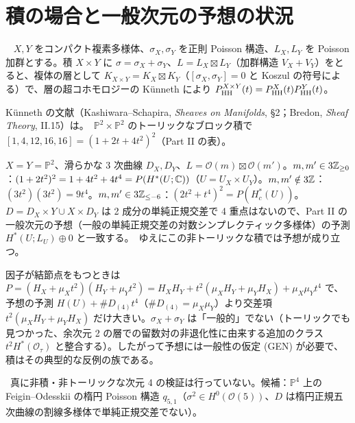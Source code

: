 \section{積の場合と一般次元の予想の状況}\label{p3:sec:prod}
\begin{prop}[Künneth]\tP\ \tQ\label{p3:prop:Kunneth}
$X,Y$ をコンパクト複素多様体、$\sigma_X,\sigma_Y$ を正則 Poisson 構造、$L_X,L_Y$ を Poisson 加群とする。積 $X\times Y$ に $\sigma=\sigma_X+\sigma_Y$、$L=L_X\boxtimes L_Y$（加群構造 $V_X+V_Y$）をとると、複体の層として $K_{X\times Y}=K_X\boxtimes K_Y$（$[\sigma_X,\sigma_Y]=0$ と Koszul の符号による）で、層の超コホモロジーの Künneth により $P^{X\times Y}_{\mathrm{HH}}(t)=P^X_{\mathrm{HH}}(t)P^Y_{\mathrm{HH}}(t)$。
\end{prop}
\noindent Künneth の文献（Kashiwara--Schapira, \emph{Sheaves on Manifolds}, \S2；Bredon, \emph{Sheaf Theory}, II.15）は\tQ。\tV\ $\mathbb P^2\times\mathbb P^2$ のトーリックなブロック積で $[1,4,12,16,16]=(1+2t+4t^2)^2$（Part II の表）。
\begin{ex}\tP\label{p3:ex:prod33}
$X=Y=\mathbb P^2$、滑らかな 3 次曲線 $D_X,D_Y$、$L=\mathcal O(m)\boxtimes\mathcal O(m')$。$m,m'\in3\mathbb Z_{\ge0}$：$(1+2t^2)^2=1+4t^2+4t^4=P(H^*(U;\mathbb C))$（$U=U_X\times U_Y$）。$m,m'\notin3\mathbb Z$：$(3t^2)(3t^2)=9t^4$。$m,m'\in3\mathbb Z_{\le-6}$：$(2t^2+t^4)^2=P(H_c^*(U))$。$D=D_X\times Y\cup X\times D_Y$ は 2 成分の単純正規交差で 4 重点はないので、Part II の一般次元の予想（一般の単純正規交差の対数シンプレクティック多様体）の予測 $H^*(U;L_U)\oplus0$ と一致する。\tP\ ゆえにこの非トーリックな積では予想が成り立つ。
\end{ex}
\begin{rem}\tP
因子が結節点をもつときは $P=(H_X+\mu_Xt^2)(H_Y+\mu_Yt^2)=H_XH_Y+t^2(\mu_XH_Y+\mu_YH_X)+\mu_X\mu_Yt^4$ で、予想の予測 $H(U)+\#D_{(4)}t^4$（$\#D_{(4)}=\mu_X\mu_Y$）より交差項 $t^2(\mu_XH_Y+\mu_YH_X)$ だけ大きい。$\sigma_X+\sigma_Y$ は「一般的」でない（トーリックでも見つかった、余次元 2 の層での留数対の非退化性に由来する追加のクラス $t^2H^*(\mathcal O_\tau)$ と整合する）。したがって予想には一般性の仮定 (GEN) が必要で、積はその典型的な反例の族である。
\end{rem}
\noindent \tK\ 真に非積・非トーリックな次元 4 の検証は行っていない。候補：$\mathbb P^4$ 上の Feigin--Odesskii の楕円 Poisson 構造 $q_{5,1}$（$\sigma^2\in H^0(\mathcal O(5))$、$D$ は楕円正規五次曲線の割線多様体で単純正規交差でない）。

